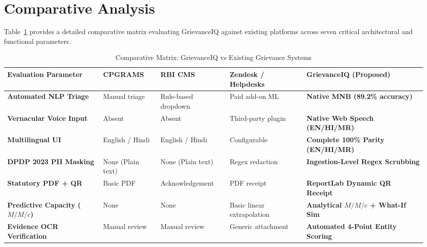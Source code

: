 \section{Comparative Analysis}
Table~\ref{tab:literature_comparison} provides a detailed comparative matrix evaluating GrievanceIQ against existing platforms across seven critical architectural and functional parameters.

\begin{table}[h]
\centering
\caption{Comparative Matrix: GrievanceIQ vs Existing Grievance Systems}
\label{tab:literature_comparison}
\begin{tabular}{|p{3.2cm}|p{2.6cm}|p{2.6cm}|p{2.6cm}|p{3.0cm}|}
\hline
\textbf{Evaluation Parameter} & \textbf{CPGRAMS} & \textbf{RBI CMS} & \textbf{Zendesk / Helpdesks} & \textbf{GrievanceIQ (Proposed)} \\ \hline
\textbf{Automated NLP Triage} & Manual triage & Rule-based dropdown & Paid add-on ML & \textbf{Native MNB (89.2\% accuracy)} \\ \hline
\textbf{Vernacular Voice Input} & Absent & Absent & Third-party plugin & \textbf{Native Web Speech (EN/HI/MR)} \\ \hline
\textbf{Multilingual UI} & English / Hindi & English / Hindi & Configurable & \textbf{Complete 100\% Parity (EN/HI/MR)} \\ \hline
\textbf{DPDP 2023 PII Masking} & None (Plain text) & None (Plain text) & Regex redaction & \textbf{Ingestion-Level Regex Scrubbing} \\ \hline
\textbf{Statutory PDF + QR} & Basic PDF & Acknowledgement & PDF receipt & \textbf{ReportLab Dynamic QR Receipt} \\ \hline
\textbf{Predictive Capacity ($M/M/c$)} & None & None & Basic linear extrapolation & \textbf{Analytical $M/M/c$ + What-If Sim} \\ \hline
\textbf{Evidence OCR Verification} & Manual review & Manual review & Generic attachment & \textbf{Automated 4-Point Entity Scoring} \\ \hline
\end{tabular}
\end{table}

